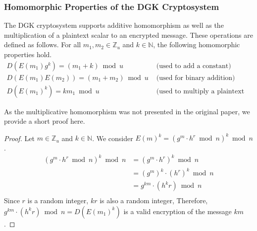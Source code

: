 \subsubsection{Homomorphic Properties of the DGK Cryptosystem}
The DGK cryptosystem supports additive homomorphism as well as the multiplication of a plaintext scalar to an encrypted message. These operations are defined as follows.
For all $m_1,m_2 \in \mathbb{Z}_u$ and $k\in \mathbb{N}$, the following homomorphic properties hold.
\begin{align*}
    D(E(m_1)g^k)=(m_1+k)\bmod u & \text{ (used to add a constant)}\\
    D(E(m_1)E(m_2))=(m_1+m_2)\bmod u & \text{ (used for binary addition)}\\
    D(E(m_1)^k)= km_1\bmod u & \text{ (used to multiply a plaintext constant)}
\end{align*}

As the multiplicative homomorphism was not presented in the original paper, we provide a short proof here.
\begin{proof}
  Let $m \in \mathbb{Z}_u$ and $k\in \mathbb{N}$.
  We consider $E(m)^k = (g^m \cdot h^r \bmod{n})^k\bmod n$.
  \begin{align*}
    (g^m \cdot h^r \bmod{n})^k \bmod n
    &= (g^m \cdot h^r)^k \bmod{n}\\
    &= (g^m)^k \cdot (h^r)^k \bmod{n}\\
    &= g^{km} \cdot (h^kr) \bmod{n}\\
  \end{align*}
  Since $r$ is a random integer, $kr$ is also a random integer, Therefore, $g^{km} \cdot (h^kr) \bmod{n} = D(E(m_1)^k)$ is a valid encryption of the message $km$.
\end{proof}



